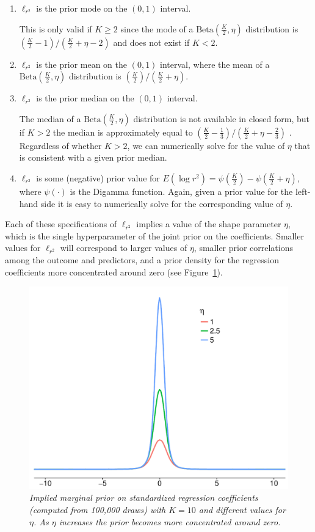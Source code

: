 \documentclass[11pt]{article}
\newcommand{\locRsq}{\ell_{r^2}}
\newcommand{\halfK}{\frac{K}{2}}
\newcommand{\Betadist}[2]{\mathrm{Beta}\left(#1,#2\right)}
\newcommand{\Digamma}[1]{\psi\left(#1\right)}
\begin{document}
\begin{enumerate}
\item $\locRsq$ is the prior mode on the $\left(0,1\right)$ interval.

This is only valid if $K \geq 2$ since the mode of a $\Betadist{\halfK}{\eta}$
distribution is \newline
$\left(\halfK - 1\right) / \left(\halfK + \eta - 2\right)$
and does not exist if $K < 2$.

\item $\locRsq$ is the prior mean on the $\left(0,1\right)$ interval, where
the mean of a $\Betadist{\halfK}{\eta}$ distribution is
$\left(\halfK\right) / \left(\halfK + \eta\right)$.

\item $\locRsq$ is the prior median on the $\left(0,1\right)$ interval.

The median of a $\Betadist{\halfK}{\eta}$ distribution is not available in
closed form, but if $K > 2$ the median is approximately equal to
$\left(\halfK - \frac{1}{3}\right) / \left(\halfK + \eta - \frac{2}{3}\right)$
\cite{kerman}. Regardless of whether $K > 2$, we can numerically solve for the
value of $\eta$ that is consistent with a given prior median.

\item $\locRsq$ is some (negative) prior value for
$E\left(\log{r^2}\right) = \Digamma{\halfK} - \Digamma{\halfK + \eta}$,
where $\Digamma{\cdot}$ is the Digamma function. Again, given a prior value for
the left-hand side it is easy to numerically solve for the corresponding value
of $\eta$.
\end{enumerate}
%
Each of these specifications of $\locRsq$ implies a value of the shape parameter
$\eta$, which is the single hyperparameter of the joint prior on the
coefficients. Smaller values for $\locRsq$ will correspond to larger values of
$\eta$, smaller prior correlations among the outcome and predictors, and a prior
density for the regression coefficients more concentrated around zero (see
Figure~\ref{fig:betaplot}).

\begin{figure}
\centering
\includegraphics[width=.67\textwidth]{betaplot.pdf}{\vspace{-.25cm}}
\caption{\em Implied marginal prior on standardized regression coefficients
(computed from 100,000 draws) with $K = 10$ and different values for $\eta$. As
$\eta$ increases the prior becomes more concentrated around zero.}
\label{fig:betaplot}
\end{figure}
\end{document}
